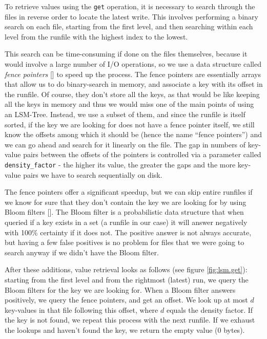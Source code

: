 To retrieve values using the \verb"get" operation, it is necessary to search through the files in reverse order to locate the latest write.
This involves performing a binary search on each file, starting from the first level, and then searching within each level from the runfile with the highest index to the lowest.

This search can be time-consuming if done on the files themselves, because it would involve a large number of I/O operations, so we use a data structure called \textit{fence pointers} [\cite{fence-pointers}] to speed up the process. The fence pointers are essentially arrays that allow us to do binary-search in memory, and associate a key with its offset in the runfile. Of course, they don't store all the keys, as that would be like keeping all the keys in memory and thus we would miss one of the main points of using an LSM-Tree. Instead, we use a subset of them, and since the runfile is itself sorted, if the key we are looking for does not have a fence pointer itself, we still know the offsets among which it should be (hence the name ``fence pointers'') and we can go ahead and search for it linearly on the file. The gap in numbers of key-value pairs between the offsets of the pointers is controlled via a parameter called \verb"density_factor" - the higher its value, the greater the gaps and the more key-value pairs we have to search sequentially on disk.

The fence pointers offer a significant speedup, but we can skip entire runfiles if we know for sure that they don't contain the key we are looking for by using Bloom filters [\cite{bloom-filters}]. The Bloom filter is a probabilistic data structure that when queried if a key exists in a set (a runfile in our case) it will answer negatively with 100\% certainty if it does not. The positive answer is not always accurate, but having a few false positives is no problem for files that we were going to search anyway if we didn't have the Bloom filter.

After these additions, value retrieval looks as follows (see figure \ref{fig:lsm.get}): starting from the first level and from the rightmost (latest) run, we query the Bloom filters for the key we are looking for. When a Bloom filter answers positively, we query the fence pointers, and get an offset. We look up at most $d$ key-values in that file following this offset, where $d$ equals the density factor. If the key is not found, we repeat this process with the next runfile. If we exhaust the lookups and haven't found the key, we return the empty value (0 bytes).

